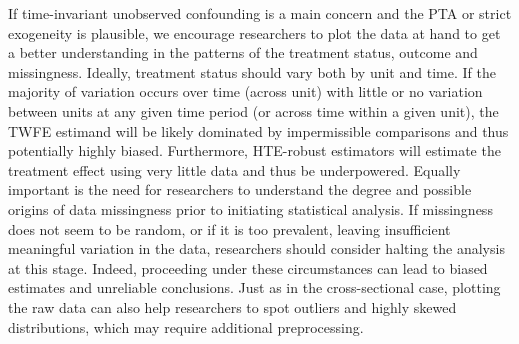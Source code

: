 \documentclass[12pt]{article}
\begin{document}
If time-invariant unobserved confounding is a main concern and the PTA or strict exogeneity is plausible, we encourage researchers to plot the data at hand to get a better understanding in the patterns of the treatment status, outcome and missingness. Ideally, treatment status should vary both by unit and time. If the majority of variation occurs over time (across unit) with little or no variation between units at any given time period (or across time within a given unit), the TWFE estimand will be likely dominated by impermissible comparisons and thus potentially highly biased. Furthermore, HTE-robust estimators will estimate the treatment effect using very little data and thus be underpowered. Equally important is the need for researchers to understand the degree and possible origins of data missingness prior to initiating statistical analysis. If missingness does not seem to be random, or if it is too prevalent, leaving insufficient meaningful variation in the data, researchers should consider halting the analysis at this stage. Indeed, proceeding under these circumstances can lead to biased estimates and unreliable conclusions. Just as in the cross-sectional case, plotting the raw data can also help researchers to spot outliers and highly skewed distributions, which may require additional preprocessing. 

\end{document}
